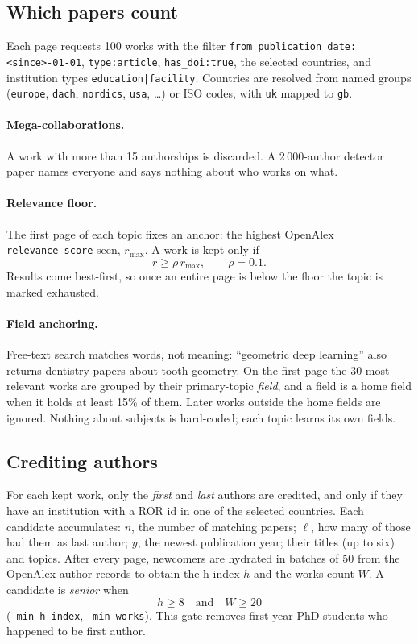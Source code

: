 \documentclass[11pt,a4paper]{article}
\newcommand{\code}[1]{\texttt{#1}}
\begin{document}
\subsection{Which papers count}
Each page requests 100 works with the filter
\code{from\_publication\_date:<since>-01-01}, \code{type:article}, \code{has\_doi:true}, the
selected countries, and institution types \code{education|facility}. Countries are resolved from
named groups (\code{europe}, \code{dach}, \code{nordics}, \code{usa}, \ldots) or ISO codes, with
\code{uk} mapped to \code{gb}.

\paragraph{Mega-collaborations.} A work with more than 15 authorships is discarded. A
2\,000-author detector paper names everyone and says nothing about who works on what.

\paragraph{Relevance floor.} The first page of each topic fixes an anchor: the highest
OpenAlex \code{relevance\_score} seen, $r_{\max}$. A work is kept only if
\[
  r \ge \rho \, r_{\max}, \qquad \rho = 0.1 .
\]
Results come best-first, so once an entire page is below the floor the topic is marked
exhausted.

\paragraph{Field anchoring.} Free-text search matches words, not meaning: ``geometric deep
learning'' also returns dentistry papers about tooth geometry. On the first page the 30 most
relevant works are grouped by their primary-topic \emph{field}, and a field is a home field when
it holds at least 15\% of them. Later works outside the home fields are ignored. Nothing about
subjects is hard-coded; each topic learns its own fields.

\subsection{Crediting authors}
For each kept work, only the \emph{first} and \emph{last} authors are credited, and only if they
have an institution with a ROR id in one of the selected countries. Each candidate accumulates:
$n$, the number of matching papers; $\ell$, how many of those had them as last author; $y$, the
newest publication year; their titles (up to six) and topics. After every page, newcomers are
hydrated in batches of 50 from the OpenAlex author records to obtain the h-index $h$ and the
works count $W$. A candidate is \emph{senior} when
\[
  h \ge 8 \quad\text{and}\quad W \ge 20
\]
(\code{--min-h-index}, \code{--min-works}). This gate removes first-year PhD students who
happened to be first author.
\end{document}
